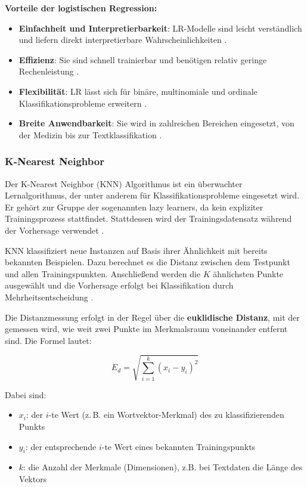 \textbf{Vorteile der logistischen Regression:}
\begin{itemize}
  \item \textbf{Einfachheit und Interpretierbarkeit}: LR-Modelle sind leicht verständlich und liefern direkt interpretierbare Wahrscheinlichkeiten \cite{aslam2022}.
  \item \textbf{Effizienz}: Sie sind schnell trainierbar und benötigen relativ geringe Rechenleistung \cite{SUDHAKAR2024101028}.
  \item \textbf{Flexibilität}: LR lässt sich für binäre, multinomiale und ordinale Klassifikationsprobleme erweitern \cite{SUDHAKAR2024101028}.
  \item \textbf{Breite Anwendbarkeit}: Sie wird in zahlreichen Bereichen eingesetzt, von der Medizin bis zur Textklassifikation \cite{aslam2022, elchami2025}.
\end{itemize}

\subsubsection{K-Nearest Neighbor}

Der K-Nearest Neighbor (KNN) Algorithmus ist ein überwachter Lernalgorithmus, der unter anderem für Klassifikationsprobleme eingesetzt wird. 
Er gehört zur Gruppe der sogenannten lazy learners, da kein expliziter Trainingsprozess stattfindet. 
Stattdessen wird der Trainingsdatensatz während der Vorhersage verwendet \cite{Verma:2024aa}.

KNN klassifiziert neue Instanzen auf Basis ihrer Ähnlichkeit mit bereits bekannten Beispielen. 
Dazu berechnet es die Distanz zwischen dem Testpunkt und allen Trainingspunkten. 
Anschließend werden die \( K \) ähnlichsten Punkte ausgewählt und die Vorhersage erfolgt bei Klassifikation durch 
Mehrheitsentscheidung \cite{aslam2022}.

Die Distanzmessung erfolgt in der Regel über die \textbf{euklidische Distanz}, mit der gemessen wird, 
wie weit zwei Punkte im Merkmalsraum voneinander entfernt sind. Die Formel lautet:

\begin{equation}
    E_d = \sqrt{ \sum_{i=1}^{k} (x_i - y_i)^2 }
\end{equation}

Dabei sind:
\begin{itemize}
    \item \( x_i \): der \( i \)-te Wert (z.\,B. ein Wortvektor-Merkmal) des zu klassifizierenden Punkts
    \item \( y_i \): der entsprechende \( i \)-te Wert eines bekannten Trainingspunkts
    \item \( k \): die Anzahl der Merkmale (Dimensionen), z.B. bei Textdaten die Länge des Vektors
\end{itemize}

